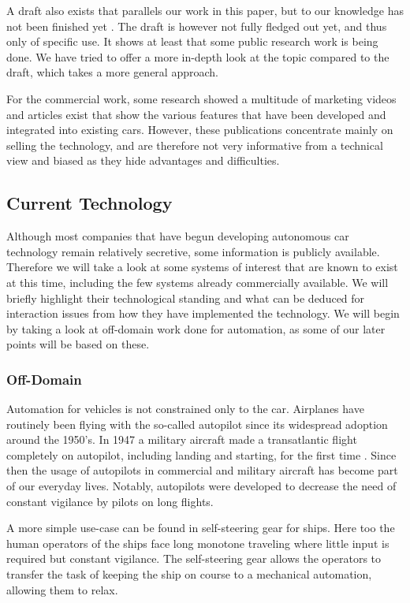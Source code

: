 \documentclass{acm_proc_article-sp}
\begin{document}
A draft also exists that parallels our work in this paper, but to our knowledge has not been finished yet \cite{cummings:authority}.
The draft is however not fully fledged out yet, and thus only of specific use.
It shows at least that some public research work is being done.
We have tried to offer a more in-depth look at the topic compared to the draft, which takes a more general approach.

For the commercial work, some research showed a multitude of marketing videos and articles exist that show the various features that have been developed and integrated into existing cars.
However, these publications concentrate mainly on selling the technology, and are therefore not very informative from a technical view and biased as they hide advantages and difficulties.

\subsection{Current Technology}
\label{current_tech}

Although most companies that have begun developing autonomous car technology remain relatively secretive, some information is publicly available.
Therefore we will take a look at some systems of interest that are known to exist at this time, including the few systems already commercially available.
We will briefly highlight their technological standing and what can be deduced for interaction issues from how they have implemented the technology.
We will begin by taking a look at off-domain work done for automation, as some of our later points will be based on these.

\subsubsection{Off-Domain}

Automation for vehicles is not constrained only to the car.
Airplanes have routinely been flying with the so-called autopilot since its widespread adoption around the 1950's.
In 1947 a military aircraft made a transatlantic flight completely on autopilot, including landing and starting, for the first time \cite{www:wiki_autopilot}.
Since then the usage of autopilots in commercial and military aircraft has become part of our everyday lives.
Notably, autopilots were developed to decrease the need of constant vigilance by pilots on long flights.

A more simple use-case can be found in self-steering gear for ships.
Here too the human operators of the ships face long monotone traveling where little input is required but constant vigilance.
The self-steering gear allows the operators to transfer the task of keeping the ship on course to a mechanical automation, allowing them to relax.
\end{document}
